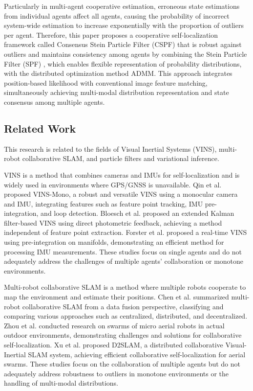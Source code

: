 \documentclass[a4paper,fleqn,10pt,twocolumn]{SICE_ISCS}
\begin{document}
Particularly in multi-agent cooperative estimation, erroneous state estimations from individual agents affect all agents, causing the probability of incorrect system-wide estimation to increase exponentially with the proportion of outliers per agent.
Therefore, this paper proposes a cooperative self-localization framework called Consensus Stein Particle Filter (CSPF) that is robust against outliers and maintains consistency among agents by combining the Stein Particle Filter (SPF) \cite{Liu2016}, which enables flexible representation of probability distributions, with the distributed optimization method ADMM. This approach integrates position-based likelihood with conventional image feature matching, simultaneously achieving multi-modal distribution representation and state consensus among multiple agents.


\subsection{Related Work}
This research is related to the fields of Visual Inertial Systems (VINS), multi-robot collaborative SLAM, and particle filters and variational inference.

VINS is a method that combines cameras and IMUs for self-localization and is widely used in environments where GPS/GNSS is unavailable. Qin et al. \cite{Qin2018} proposed VINS-Mono, a robust and versatile VINS using a monocular camera and IMU, integrating features such as feature point tracking, IMU pre-integration, and loop detection. Bloesch et al. \cite{Bloesch2017} proposed an extended Kalman filter-based VINS using direct photometric feedback, achieving a method independent of feature point extraction. Forster et al. \cite{Forster2017} proposed a real-time VINS using pre-integration on manifolds, demonstrating an efficient method for processing IMU measurements. These studies focus on single agents and do not adequately address the challenges of multiple agents' collaboration or monotone environments.

Multi-robot collaborative SLAM is a method where multiple robots cooperate to map the environment and estimate their positions. Chen et al. \cite{Chen2021} summarized multi-robot collaborative SLAM from a data fusion perspective, classifying and comparing various approaches such as centralized, distributed, and decentralized. Zhou et al. \cite{Zhou2018} conducted research on swarms of micro aerial robots in actual outdoor environments, demonstrating challenges and solutions for collaborative self-localization. Xu et al. \cite{Xu2020} proposed D2SLAM, a distributed collaborative Visual-Inertial SLAM system, achieving efficient collaborative self-localization for aerial swarms. These studies focus on the collaboration of multiple agents but do not adequately address robustness to outliers in monotone environments or the handling of multi-modal distributions.
\end{document}
